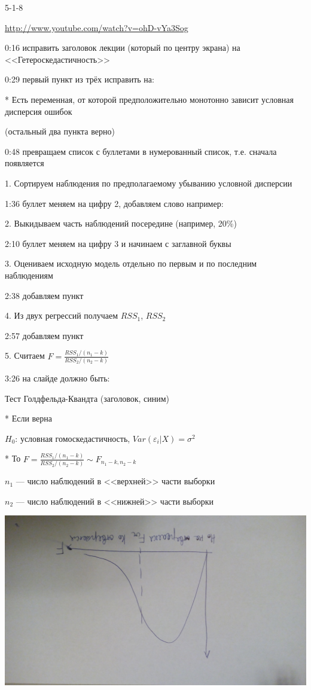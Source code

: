 \documentclass[12pt,a4paper]{article}
\newcommand{\e}{\varepsilon}
\begin{document}
5-1-8  

\url{http://www.youtube.com/watch?v=ohD-vYa3Sog}

0:16 исправить заголовок лекции (который по центру экрана) на <<Гетероскедастичность>>

0:29 первый пункт из трёх исправить на:

* Есть переменная, от которой предположительно монотонно зависит условная дисперсия ошибок

(остальный два пункта верно)

0:48 превращаем список с буллетами в нумерованный список, т.е. сначала появляется

1. Сортируем наблюдения по предполагаемому убыванию условной дисперсии

1:36 буллет меняем на цифру 2, добавляем слово например:

2. Выкидываем часть наблюдений посередине (например, 20\%)

2:10 буллет меняем на цифру 3 и начинаем с заглавной буквы

3. Оцениваем исходную модель отдельно по первым и по последним наблюдениям

2:38 добавляем пункт

4. Из двух регрессий получаем $RSS_1$, $RSS_2$

2:57 добавляем пункт

5. Считаем $F=\frac{RSS_1/(n_1-k)}{RSS_2/(n_2-k)}$

3:26 на слайде должно быть:

Тест Голдфельда-Квандта (заголовок, синим)

* Если верна

$H_0$: условная гомоскедастичность, $Var(\e_i|X)=\sigma^2$

* То $F=\frac{RSS_1/(n_1-k)}{RSS_2/(n_2-k)} \sim F_{n_1-k,n_2-k}$

$n_1$ --- число наблюдений в <<верхней>> части выборки

$n_2$ --- число наблюдений в <<нижней>> части выборки

\includegraphics[scale=0.1, angle=180]{goldfeld_test.jpg} 
\end{document}
